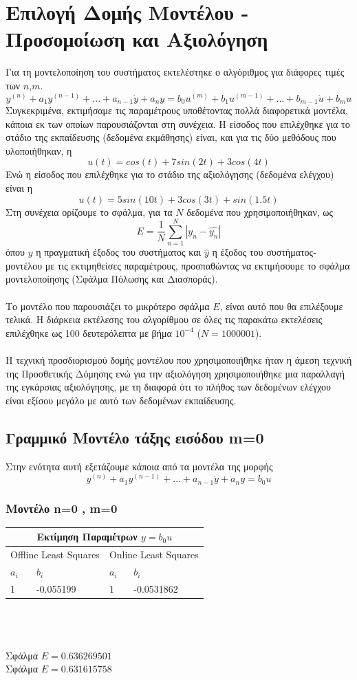 \documentclass[12pt]{article}
\begin{document}
\section{Επιλογή Δομής Μοντέλου - Προσομοίωση και Αξιολόγηση}
Για τη μοντελοποίηση του συστήματος εκτελέστηκε ο αλγόριθμος για διάφορες τιμές των $n$,$m$.
\[ y^{(n)}+a_1y^{(n-1)}+...+a_{n-1}\dot{y}+a_{n}y=b_0 u^{(m)}+b_1u^{(m-1)}+...+b_{m-1}\dot{u}+b_{m}u \]
Συγκεκριμένα, εκτιμήσαμε τις παραμέτρους υποθέτοντας πολλά διαφορετικά μοντέλα, κάποια εκ των οποίων παρουσιάζονται στη συνέχεια. Η είσοδος που επιλέχθηκε για το στάδιο της εκπαίδευσης (δεδομένα εκμάθησης) είναι, και για τις δύο μεθόδους που υλοποιήθηκαν, η
 \[ u(t)=cos(t)+7sin(2t)+3cos(4t) \]
Ενώ η είσοδος που επιλέχθηκε για το στάδιο της αξιολόγησης (δεδομένα ελέγχου) είναι η
\[ u(t)=5sin(10t)+3cos(3t)+sin(1.5t) \]
Στη συνέχεια ορίζουμε το σφάλμα, για τα $N$ δεδομένα που χρησιμοποιήθηκαν, ως
\[ E=\frac{1}{N} \sum_{n=1}^{N} \left| y_n-\hat{y_n} \right| \]
όπου $y$ η πραγματική έξοδος του συστήματος και $\hat{y}$ η έξοδος του συστήματος-μοντέλου με τις εκτιμηθείσες παραμέτρους, προσπαθώντας να εκτιμήσουμε το σφάλμα μοντελοποίησης (Σφάλμα Πόλωσης και Διασποράς).
\\ \\
Το μοντέλο που παρουσιάζει το μικρότερο σφάλμα $E$, είναι αυτό που θα επιλέξουμε τελικά. Η διάρκεια εκτέλεσης του αλγορίθμου σε όλες τις παρακάτω εκτελέσεις επιλέχθηκε ως 100 δευτερόλεπτα με βήμα $10^{-4}$ ($N=1000001$).
\\ \\
Η τεχνική προσδιορισμού δομής μοντέλου που χρησιμοποιήθηκε ήταν η άμεση τεχνική της Προσθετικής Δόμησης ενώ για την αξιολόγηση χρησιμοποιήθηκε μια παραλλαγή της εγκάρσιας αξιολόγησης, με τη διαφορά ότι το πλήθος των δεδομένων ελέγχου είναι εξίσου μεγάλο με αυτό των δεδομένων εκπαίδευσης. 
\subsection{Γραμμικό Μοντέλο τάξης εισόδου m=0}
Στην ενότητα αυτή εξετάζουμε κάποια από τα μοντέλα της μορφής
\[ y^{(n)}+a_1y^{(n-1)}+...+a_{n-1}\dot{y}+a_{n}y=b_0u \]
\subsubsection{Μοντέλο n=0 , m=0}
\begin{tabular}{ |p{2.5cm}|p{2.5cm}||p{2.5cm}|p{2.5cm}| }
\hline
\multicolumn{4}{|c|}{ Εκτίμηση Παραμέτρων $y= b_{0}u$}\\
\hline
\multicolumn{2}{|c||}{Offline Least Squares}&
\multicolumn{2}{|c|}{Online Least Squares }
\\
\hline
$ a_{i}$ & $b_i$ &$ a_{i}$ & $b_i$  \\
\hline
 1 &  -0.055199 & 1 & -0.0531862  \\
\hline
\end{tabular}
\\ \\ \\
Σφάλμα $E= 0.636269501$\\
Σφάλμα $E= 0.631615758$
\end{document}
